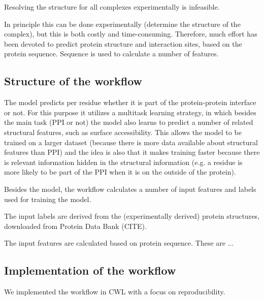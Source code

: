Resolving the structure for all complexes experimentally is infeasible. 

In principle this can be done experimentally (determine the structure of the complex), but this is both costly and time-consuming. Therefore, much effort has been devoted to predict protein structure and interaction sites, based on the protein sequence. Sequence is used to calculate a number of features.

\subsection{Structure of the workflow}

The model predicts per residue whether it is part of the protein-protein interface or not. For this purpose it utilizes a multitask learning strategy, in which besides the main task (PPI or not) the model also learns to predict a number of related structural features, such as surface accessibility. This allows the model to be trained on a larger dataset (because there is more data available about structural features than PPI) and the idea is also that it makes training faster because there is relevant information hidden in the structural information (e.g. a residue is more likely to be part of the PPI when it is on the outside of the protein). 

Besides the model, the workflow calculates a number of input features and labels used for training the model.

The input labels are derived from the (experimentally derived) protein structures, downloaded from Protein Data Bank (CITE). 

The input features are calculated based on protein sequence. These are ...

\subsection{Implementation of the workflow}

We implemented the workflow in CWL with a focus on reproducibility. 


